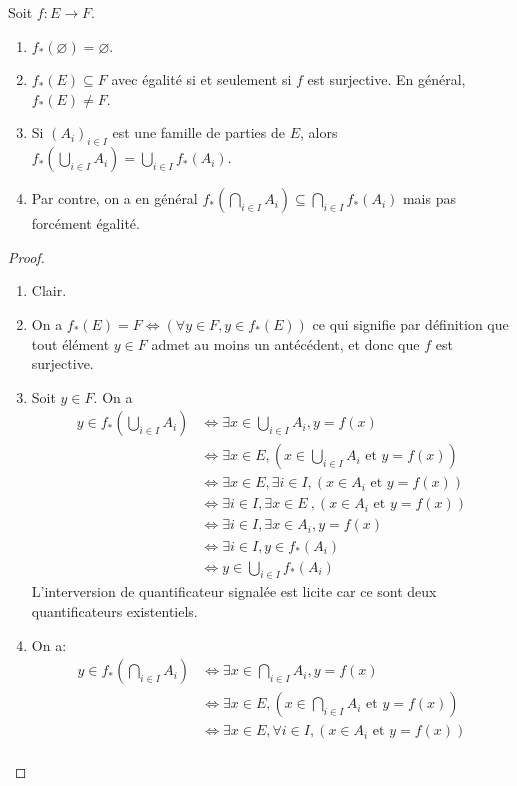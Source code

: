 \begin{proposition}
Soit $f : E\to F$.
\begin{enumerate}
\item $f_*(\varnothing)=\varnothing$.
\item $f_*(E)\subseteq F$ avec égalité si et seulement si $f$ est surjective. En général, $f_*(E)\neq F$.
\item Si $(A_i)_{i\in I}$ est une famille de parties de $E$, alors $f_*\left(\bigcup_{i\in I}A_i\right) = \bigcup_{i\in I} f_*(A_i)$.
\item Par contre, on a en général $f_*\left(\bigcap_{i\in I}A_i\right) \subseteq \bigcap_{i\in I} f_*\left(A_i\right)$ mais pas forcément égalité.
\end{enumerate}
\end{proposition}
\begin{proof}
\begin{enumerate}
\item Clair.
\item On a $f_*(E)=F \iff (\forall y\in F, y\in f_*(E))$ ce qui signifie par définition que tout élément $y\in F$ admet au moins un antécédent, et donc que $f$ est surjective.  
\item Soit $y\in F$. On a 
\begin{align*}
y\in f_*\left( \bigcup_{i\in I} A_i \right)
&\iff \exists x\in  \bigcup_{i\in I} A_i,   y=f(x) \\
&\iff \exists x\in E, \left( x\in \bigcup_{i\in I} A_i\text{ et }  y=f(x)\right)\\
&\iff \exists x\in E, \exists i\in I,  (x\in A_i\text{ et } y=f(x)) \\
&\boxed{\iff \exists i\in I, \exists x\in E}\:, (x\in A_i\text{ et } y=f(x))\\
&\iff \exists i\in I, \exists x\in A_i, y=f(x)\\
&\iff \exists i\in I, y\in f_*(A_i)\\
&\iff y\in \bigcup_{i\in I} f_*(A_i)
\end{align*}
L'interversion de quantificateur signalée est licite car ce sont deux quantificateurs existentiels.
\item On a:
\begin{align*}
y\in f_*\left( \bigcap_{i\in I} A_i \right)
&\iff \exists x\in  \bigcap_{i\in I} A_i,   y=f(x) \\
&\iff \exists x\in E, \left( x\in \bigcap_{i\in I} A_i\text{ et }  y=f(x)\right)\\
&\iff \exists x\in E, \forall i\in I,  (x\in A_i\text{ et } y=f(x)) \\

\end{align*}
\end{enumerate}
\end{proof}
